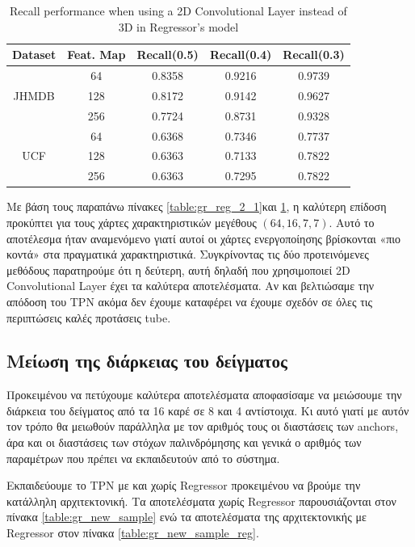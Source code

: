 \begin{table}[h]
  \centering
  \begin{tabular}{||c | c || c  c  c||}
    \hline
    \textbf{Dataset}  & \textbf{Feat. Map} & \textbf{Recall(0.5)} & \textbf{Recall(0.4)} & \textbf{Recall(0.3)}\\
    \hline
    \multirow{3}{*}{JHMDB} & 64 & 0.8358 & 0.9216 & 0.9739\\
    \cline{2-5}
    {} & 128 & 0.8172 & 0.9142 & 0.9627 \\
    \cline{2-5}
    {} & 256 & 0.7724 & 0.8731 & 0.9328 \\
    \hline
    \multirow{3}{*}{UCF} & 64 & 0.6368 & 0.7346 & 0.7737 \\ 
    \cline{2-5}
    {} & 128 & 0.6363 & 0.7133 & 0.7822 \\
    \cline{2-5}
    {} & 256 &  0.6363 & 0.7295 & 0.7822 \\
    \hline

  \end{tabular}
  \caption{Recall performance when using a 2D Convolutional Layer instead of 3D in Regressor's model}
  \label{table:gr_reg_2_2}
\end{table}
\gr

Με βάση τους παραπάνω πίνακες \en\ref{table:gr_reg_2_1}\gr και \en\ref{table:gr_reg_2_2}\gr, η καλύτερη επίδοση προκύπτει για τους χάρτες χαρακτηριστικών μεγέθους $(64,16,7,7)$. Αυτό το
αποτέλεσμα ήταν αναμενόμενο γιατί αυτοί οι χάρτες ενεργοποίησης βρίσκονται «πιο κοντά» στα πραγματικά χαρακτηριστικά. Συγκρίνοντας
τις δύο προτεινόμενες μεθόδους παρατηρούμε ότι η δεύτερη, αυτή δηλαδή που χρησιμοποιεί \en 2D Convolutional Layer \gr έχει τα καλύτερα
αποτελέσματα. Αν και βελτιώσαμε την απόδοση του \en TPN \gr ακόμα δεν έχουμε καταφέρει να έχουμε σχεδόν σε όλες τις περιπτώσεις
καλές προτάσεις \en tube\gr.
\subsection{Μείωση της διάρκειας του δείγματος}
Προκειμένου να πετύχουμε καλύτερα αποτελέσματα αποφασίσαμε να μειώσουμε την διάρκεια του δείγματος από τα 16 καρέ σε 8 και 4 αντίστοιχα. Κι
αυτό γιατί με αυτόν τον τρόπο θα μειωθούν παράλληλα με τον αριθμός τους οι διαστάσεις των \en anchors, \gr  άρα και οι διαστάσεις των στόχων παλινδρόμησης και γενικά ο αριθμός των παραμέτρων που πρέπει να εκπαιδευτούν από το σύστημα. \par
Εκπαιδεύουμε το \en TPN \gr με και χωρίς \en Regressor \gr προκειμένου να βρούμε την κατάλληλη αρχιτεκτονική. Τα αποτελέσματα χωρίς \en Regressor \gr
παρουσιάζονται στον πίνακα \ref{table:gr_new_sample} ενώ τα αποτελέσματα της αρχιτεκτονικής με \en Regressor \gr στον πίνακα \ref{table:gr_new_sample_reg}.


